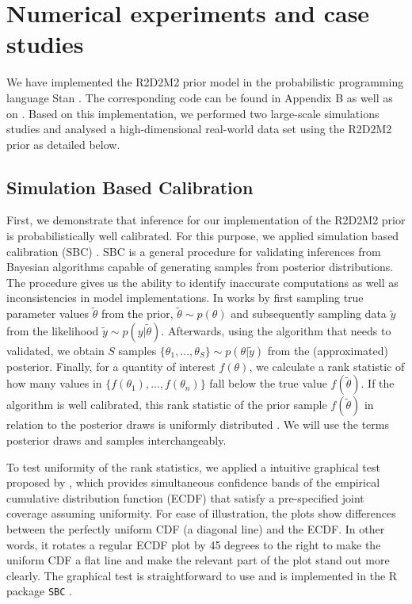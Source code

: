 \section{Numerical experiments and case studies}
\label{sec:examples}

We have implemented the R2D2M2 prior model in the probabilistic programming language Stan \citep{StanJSS, stan2022}. The corresponding code can be found in Appendix B as well as on {\myosfresults}. Based on this implementation, we performed two large-scale simulations studies and analysed a high-dimensional real-world data set using the R2D2M2 prior as detailed below.

\subsection{Simulation Based Calibration}
\label{subsection:SBC}

First, we demonstrate that inference for our implementation of the R2D2M2 prior is probabilistically well calibrated. For this purpose, we applied simulation based calibration (SBC) \citep{taltssbc}. SBC is a general procedure for validating inferences from Bayesian algorithms capable of generating samples from posterior distributions. The procedure gives us the ability to identify inaccurate computations as well as inconsistencies in model implementations. In works by first sampling true parameter values $\tilde{\theta}$ from the prior, $\tilde{\theta} \sim p(\theta)$ and subsequently sampling data $\tilde{y}$ from the likelihood $\tilde{y} \sim p(y|\tilde{\theta})$. Afterwards, using the algorithm that needs to validated, we obtain $S$ samples $\{\theta_1,...,\theta_S  \} \sim p(\theta | \tilde{y})$ from the (approximated) posterior. Finally, for a quantity of interest $f(\theta)$, we calculate a rank statistic of how many values in $\{ f(\theta_1),..., f(\theta_n) \}$ fall below the true value $f(\tilde{\theta})$. If the algorithm is well calibrated, this rank statistic of the prior sample $f(\tilde{\theta})$ in relation to the posterior draws is uniformly distributed \citep{taltssbc}. We will use the terms posterior draws and samples interchangeably.

To test uniformity of the rank statistics, we applied a intuitive graphical test proposed by \cite{teemubuerknergraphical}, which provides simultaneous confidence bands of the empirical cumulative distribution function (ECDF) that satisfy a pre-specified joint coverage assuming uniformity. For ease of illustration, the plots show differences between the perfectly uniform CDF (a diagonal line) and the ECDF. In other words, it rotates a regular ECDF plot by 45 degrees to the right to make the uniform CDF a flat line and make the relevant part of the plot stand out more clearly. The graphical test is straightforward to use and is implemented in the R package \texttt{SBC} \citep{sbcmanual}.

